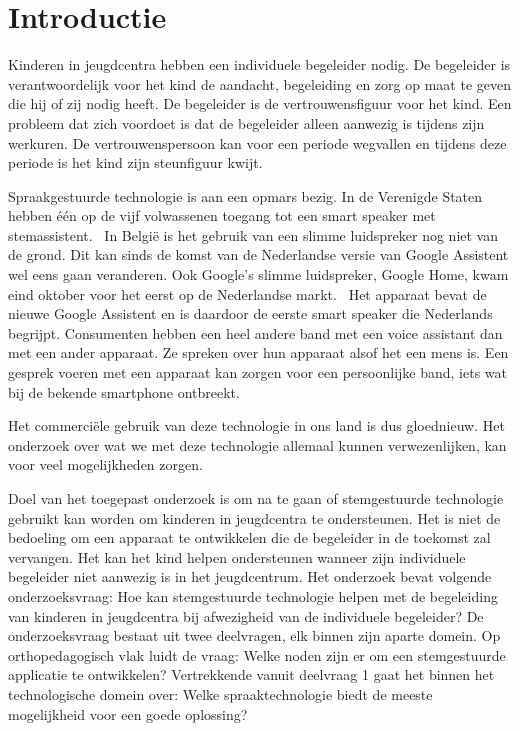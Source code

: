 
\section{Introductie} %
\label{sec:introductie}
Kinderen in jeugdcentra hebben een individuele begeleider nodig. De begeleider is verantwoordelijk voor het kind de aandacht, begeleiding en zorg op maat te geven die hij of zij nodig heeft. De begeleider is de vertrouwensfiguur voor het kind.
Een probleem dat zich voordoet is dat de begeleider alleen aanwezig is tijdens zijn werkuren. De vertrouwenspersoon kan voor een periode wegvallen en tijdens deze periode is het kind zijn steunfiguur kwijt.

Spraakgestuurde technologie is aan een opmars bezig. In de Verenigde Staten hebben één op de vijf volwassenen toegang tot een smart speaker met stemassistent.~\autocite{Passies2018} In België is het gebruik van een slimme luidspreker nog niet van de grond. Dit kan sinds de komst van de Nederlandse versie van Google Assistent wel eens gaan veranderen. Ook Google's slimme luidspreker, Google Home, kwam eind oktober voor het eerst op de Nederlandse markt.~\autocite{Haenen2018} Het apparaat bevat de nieuwe Google Assistent en is daardoor de eerste smart speaker die Nederlands begrijpt. Consumenten hebben een heel andere band met een voice assistant dan met een ander apparaat. Ze spreken over hun apparaat alsof het een mens is.\autocite{Schueler2018} Een gesprek voeren met een apparaat kan zorgen voor een persoonlijke band, iets wat bij de bekende smartphone ontbreekt.

Het commerciële gebruik van deze technologie in ons land is dus gloednieuw. Het onderzoek over wat we met deze technologie allemaal kunnen verwezenlijken, kan voor veel mogelijkheden zorgen.

Doel van het toegepast onderzoek is om na te gaan of stemgestuurde technologie gebruikt kan worden om kinderen in jeugdcentra te ondersteunen. Het is niet de bedoeling om een apparaat te ontwikkelen die de begeleider in de toekomst zal vervangen. Het kan het kind helpen ondersteunen wanneer zijn individuele begeleider niet aanwezig is in het jeugdcentrum.
Het onderzoek bevat volgende onderzoeksvraag: Hoe kan stemgestuurde technologie helpen met de begeleiding van kinderen in jeugdcentra bij afwezigheid van de individuele begeleider? 
De onderzoeksvraag bestaat uit twee deelvragen, elk binnen zijn aparte domein. Op orthopedagogisch vlak luidt de vraag: Welke noden zijn er om een stemgestuurde applicatie te ontwikkelen? Vertrekkende vanuit deelvraag 1 gaat het binnen het technologische domein over: Welke spraaktechnologie biedt de meeste mogelijkheid voor een goede oplossing?

